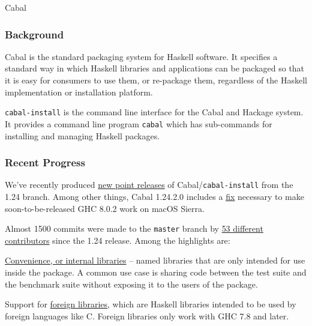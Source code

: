 \begin{hcarentry}{Cabal}
\label{cabal}%
\makeheader

\subsubsection*{Background}

Cabal is the standard packaging system for Haskell software. It specifies a
standard way in which Haskell libraries and applications can be packaged so
that it is easy for consumers to use them, or re-package them, regardless of
the Haskell implementation or installation platform.

\texttt{cabal-install} is the command line interface for the Cabal and Hackage
system. It provides a command line program \texttt{cabal} which has
sub-commands for installing and managing Haskell packages.

\subsubsection*{Recent Progress}

We've recently produced
\href{https://mail.haskell.org/pipermail/cabal-devel/2016-December/010384.html}{new
  point releases} of Cabal/\texttt{cabal-install} from the 1.24
branch. Among other things, Cabal 1.24.2.0 includes a
\href{https://ghc.haskell.org/trac/ghc/ticket/12479}{fix} necessary to
make soon-to-be-released GHC 8.0.2 work on macOS Sierra.

Almost 1500 commits were made to the \texttt{master} branch by
\href{https://gist.github.com/23Skidoo/1a291fd56a18b51f415db5fbaff56ec6}{53
different contributors} since the 1.24 release. Among the highlights are:

\begin{compactitem}
\item
  \href{http://cabal.readthedocs.io/en/latest/developing-packages.html#library}{Convenience,
    or internal libraries} -- named libraries that are only intended
  for use inside the package. A common use case is sharing code
  between the test suite and the benchmark suite without exposing it
  to the users of the package.

\item Support for
  \href{http://cabal.readthedocs.io/en/latest/developing-packages.html#foreign-libraries}{foreign
    libraries}, which are Haskell libraries intended to be used by
  foreign languages like C.  Foreign libraries only work with GHC 7.8
  and later.


\end{compactitem}
\end{hcarentry}
